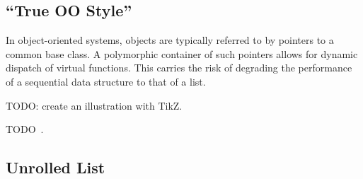 \subsection{``True OO Style''}

%


In object-oriented systems, objects are typically referred to by pointers to a common base
class.  A polymorphic container of such pointers allows for dynamic dispatch of virtual
functions.  This carries the risk of degrading the  performance of a
sequential data structure to that of a list.

TODO: create an illustration with TikZ.

TODO~\cite[42:00]{stroustrup-talk}.

\subsection{Unrolled List}


